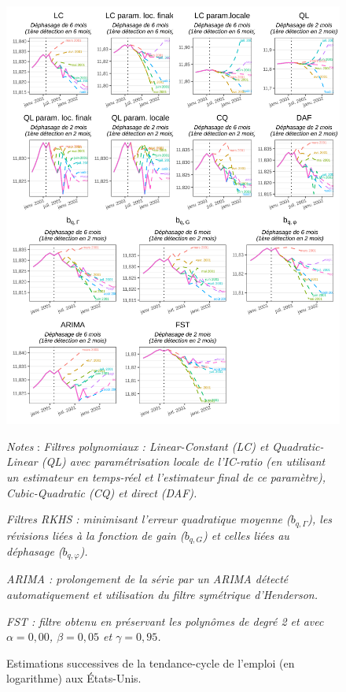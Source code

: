 \documentclass[
  12pt,
  a4paper,french]{article}
\newcommand\1{\mathds{1}}
\begin{document}
\begin{figure}

{\centering \includegraphics[width=0.95\linewidth]{img/nber/ce16ov_fev2001} 

}

\caption[Estimations successives de la tendance-cycle de l'emploi (en logarithme) aux États-Unis]{Estimations successives de la tendance-cycle de l'emploi (en logarithme) aux États-Unis.}\label{fig:ce16ovlp}

\footnotesize


\emph{Notes} : \emph{Filtres polynomiaux : \emph{Linear-Constant} (LC) et \emph{Quadratic-Linear} (QL) avec paramétrisation locale de l'IC-ratio (en utilisant un estimateur en temps-réel et l'estimateur final de ce paramètre), \emph{Cubic-Quadratic} (CQ) et direct (DAF).}

\emph{Filtres RKHS : minimisant l'erreur quadratique moyenne (\(b_{q,\Gamma}\)), les révisions liées à la fonction de gain (\(b_{q,G}\)) et celles liées au déphasage (\(b_{q,\varphi}\)).}

\emph{ARIMA : prolongement de la série par un ARIMA détecté automatiquement et utilisation du filtre symétrique d'Henderson.}

\emph{FST : filtre obtenu en préservant les polynômes de degré 2 et avec \(\alpha=0,00\), \(\beta=0,05\) et \(\gamma=0,95\).}
\normalsize\end{figure}
\end{document}
